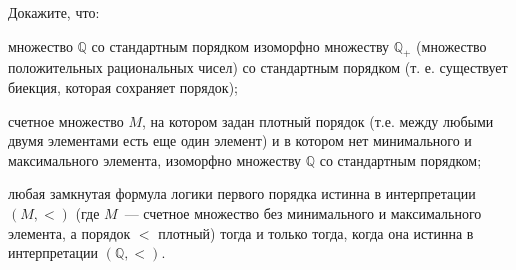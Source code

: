 Докажите, что:
\begin{enumcyr}
    \item множество $\mathbb{Q}$ со стандартным порядком изоморфно множеству $\mathbb{Q}_{+}$ (множество
        положительных рациональных чисел) со стандартным порядком (т. е. существует биекция, которая
        сохраняет порядок);
    \item счетное множество $M$, на котором задан плотный порядок (т.е. между любыми двумя элементами
        есть еще один элемент) и в котором нет минимального и максимального элемента, изоморфно множеству
        $\mathbb{Q}$ со стандартным порядком;
    \item любая замкнутая формула логики первого порядка истинна в интерпретации $(M, <)$ (где $M$~---
        счетное множество без минимального и максимального элемента, а порядок $<$ плотный) тогда и
        только тогда, когда она истинна в интерпретации $(\mathbb{Q}, <)$.
\end{enumcyr}